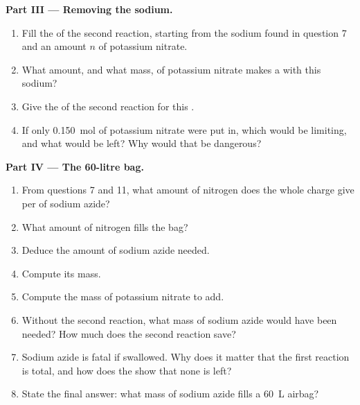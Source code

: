 \begin{problem}
\medskip
\noindent\textbf{Part III --- Removing the sodium.}
\begin{enumerate}[resume]
  \item Fill the  of the second reaction, starting from
        the sodium found in question 7 and an amount $n$ of potassium
        nitrate.
  \item What amount, and what mass, of potassium nitrate makes a
         with this sodium?
  \item Give the  of the second reaction for this .
  \item If only \qty{0.150}{mol} of potassium nitrate were put in, which
         would be limiting, and what would be left? Why would
        that be dangerous?
\end{enumerate}

\medskip
\noindent\textbf{Part IV --- The 60-litre bag.}
\begin{enumerate}[resume]
  \item From questions 7 and 11, what amount of nitrogen does the whole
        charge give per  of sodium azide?
  \item What amount of nitrogen fills the bag?
  \item Deduce the amount of sodium azide needed.
  \item Compute its mass.
  \item Compute the mass of potassium nitrate to add.
  \item Without the second reaction, what mass of sodium azide would
        have been needed? How much does the second reaction save?
  \item Sodium azide is fatal if swallowed. Why does it matter that the
        first reaction is total, and how does the  show
        that none is left?
  \item State the final answer: what mass of sodium azide fills a
        \qty{60}{L} airbag?
\end{enumerate}
\end{problem}
